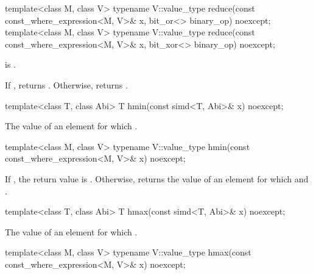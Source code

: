 \begin{itemdecl}
template<class M, class V>
  typename V::value_type reduce(const const_where_expression<M, V>& x, bit_or<> binary_op) noexcept;
template<class M, class V>
  typename V::value_type reduce(const const_where_expression<M, V>& x, bit_xor<> binary_op) noexcept;
\end{itemdecl}

\begin{itemdescr}
  \pnum\requires
   is .

  \pnum\returns
  If , returns . Otherwise, returns  \forallmaskedi.
\end{itemdescr}

\begin{itemdecl}
template<class T, class Abi> T hmin(const simd<T, Abi>& x) noexcept;
\end{itemdecl}

\begin{itemdescr}
  \pnum\returns
  The value of an element  for which  \foralli.
\end{itemdescr}

\begin{itemdecl}
template<class M, class V> typename V::value_type hmin(const const_where_expression<M, V>& x) noexcept;
\end{itemdecl}

\begin{itemdescr}
  \pnum\returns
  If , the return value is . Otherwise, returns the value of an element  for which  and  \forallmaskedi.
\end{itemdescr}

\begin{itemdecl}
template<class T, class Abi> T hmax(const simd<T, Abi>& x) noexcept;
\end{itemdecl}

\begin{itemdescr}
  \pnum\returns
  The value of an element  for which  \foralli.
\end{itemdescr}

\begin{itemdecl}
template<class M, class V> typename V::value_type hmax(const const_where_expression<M, V>& x) noexcept;
\end{itemdecl}

